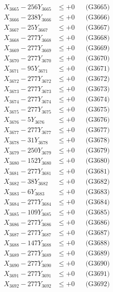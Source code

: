 \documentclass[a4paper,10pt]{article}
\begin{document}
{\begin{align}
X_{3665} - 256Y_{3665} &\leq +0 && \text{(G3665)} \\
X_{3666} - 238Y_{3666} &\leq +0 && \text{(G3666)} \\
X_{3667} - 25Y_{3667} &\leq +0 && \text{(G3667)} \\
X_{3668} - 277Y_{3668} &\leq +0 && \text{(G3668)} \\
X_{3669} - 277Y_{3669} &\leq +0 && \text{(G3669)} \\
X_{3670} - 277Y_{3670} &\leq +0 && \text{(G3670)} \\
\allowbreak
X_{3671} - 95Y_{3671} &\leq +0 && \text{(G3671)} \\
X_{3672} - 277Y_{3672} &\leq +0 && \text{(G3672)} \\
X_{3673} - 277Y_{3673} &\leq +0 && \text{(G3673)} \\
X_{3674} - 277Y_{3674} &\leq +0 && \text{(G3674)} \\
X_{3675} - 277Y_{3675} &\leq +0 && \text{(G3675)} \\
X_{3676} - 5Y_{3676} &\leq +0 && \text{(G3676)} \\
X_{3677} - 277Y_{3677} &\leq +0 && \text{(G3677)} \\
X_{3678} - 31Y_{3678} &\leq +0 && \text{(G3678)} \\
X_{3679} - 250Y_{3679} &\leq +0 && \text{(G3679)} \\
X_{3680} - 152Y_{3680} &\leq +0 && \text{(G3680)} \\
\allowbreak
X_{3681} - 277Y_{3681} &\leq +0 && \text{(G3681)} \\
X_{3682} - 38Y_{3682} &\leq +0 && \text{(G3682)} \\
X_{3683} - 6Y_{3683} &\leq +0 && \text{(G3683)} \\
X_{3684} - 277Y_{3684} &\leq +0 && \text{(G3684)} \\
X_{3685} - 109Y_{3685} &\leq +0 && \text{(G3685)} \\
X_{3686} - 277Y_{3686} &\leq +0 && \text{(G3686)} \\
X_{3687} - 277Y_{3687} &\leq +0 && \text{(G3687)} \\
X_{3688} - 147Y_{3688} &\leq +0 && \text{(G3688)} \\
X_{3689} - 277Y_{3689} &\leq +0 && \text{(G3689)} \\
X_{3690} - 277Y_{3690} &\leq +0 && \text{(G3690)} \\
\allowbreak
X_{3691} - 277Y_{3691} &\leq +0 && \text{(G3691)} \\
X_{3692} - 277Y_{3692} &\leq +0 && \text{(G3692)} \\

\end{align}}
\end{document}
